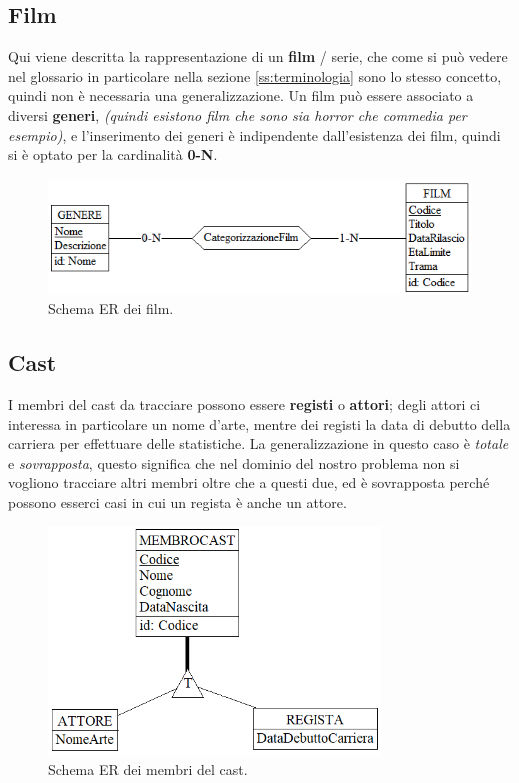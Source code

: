 \documentclass[a4paper,12pt]{report}
\begin{document}
	\subsection{Film}
	Qui viene descritta la rappresentazione di un \textbf{film} / serie, che come si può vedere nel glossario in particolare nella sezione \ref{ss:terminologia} sono lo stesso concetto, quindi non è necessaria una generalizzazione. Un film può essere associato a diversi \textbf{generi}, \textit{(quindi esistono film che sono sia horror che commedia per esempio)}, e l'inserimento dei generi è indipendente dall'esistenza dei film, quindi si è optato per la cardinalità \textbf{0-N}.
	\begin{figure}[H]
		\centering
		\includegraphics[width=450pt]{ER/film.png}
		\caption{Schema ER dei film.}
	\end{figure}
	\subsection{Cast}
	I membri del cast da tracciare possono essere \textbf{registi} o \textbf{attori}; degli attori ci interessa in particolare un nome d'arte, mentre dei registi la data di debutto della carriera per effettuare delle statistiche. La generalizzazione in questo caso è \textit{totale} e \textit{sovrapposta}, questo significa che nel dominio del nostro problema non si vogliono tracciare altri membri oltre che a questi due, ed è sovrapposta perché possono esserci casi in cui un regista è anche un attore.
	\begin{figure}[H]
		\centering
		\includegraphics[width=250pt]{ER/cast.png}
		\caption{Schema ER dei membri del cast.}
	\end{figure}
\end{document}
